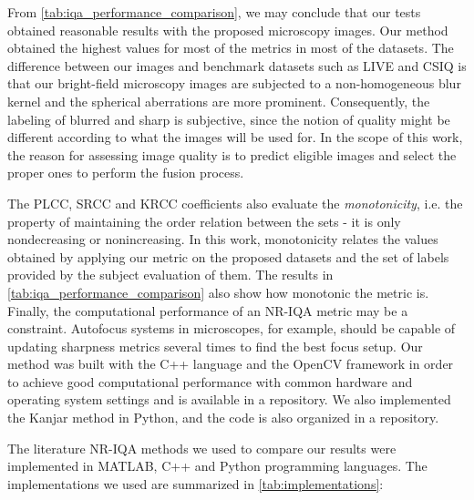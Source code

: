 From \autoref{tab:iqa_performance_comparison}, we may conclude that our tests obtained reasonable results with the proposed microscopy images. Our method obtained the highest values for most of the metrics in most of the datasets.  The difference between our images and benchmark datasets such as LIVE \cite{sheikh2006statistical} and CSIQ \cite{larson2010most} is that our bright-field microscopy images are subjected to a non-homogeneous blur kernel and the spherical aberrations are more prominent. Consequently, the labeling of blurred and sharp is subjective, since the notion of quality might be different according to what the images will be used for. In the scope of this work, the reason for assessing image quality is to predict eligible images and select the proper ones to perform the fusion process.

The PLCC, SRCC and KRCC coefficients also evaluate the \textit{monotonicity}, i.e. the property of maintaining the order relation between the sets - it is only nondecreasing or nonincreasing. In this work, monotonicity relates the values obtained by applying our metric on the proposed datasets and the set of labels provided by the subject evaluation of them. The results in \autoref{tab:iqa_performance_comparison} also show how monotonic the metric is. Finally, the computational performance of an NR-IQA metric may be a constraint. Autofocus systems in microscopes, for example, should be capable of updating sharpness metrics several times to find the best focus setup. Our method was built with the C++ language and the OpenCV framework in order to achieve good computational performance with common hardware and operating system settings and is available in a repository. We also implemented the Kanjar method in Python, and the code is also organized in a repository. 

The literature NR-IQA methods we used to compare our results were implemented in MATLAB, C++ and Python programming languages. The implementations we used are summarized in \autoref{tab:implementations}:

